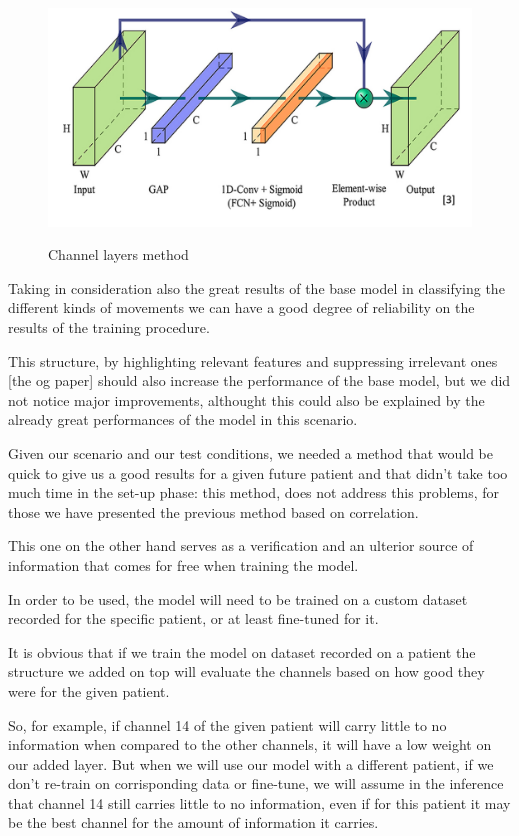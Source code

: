\documentclass{Configuration_Files/PoliMi3i_thesis}
\begin{document}
\begin{figure}[H]
	\includegraphics[scale=0.35]{channelLayer.png}
	\centering
    \label{channel_layers}
    \caption{Channel layers method \cite{tongLearnableEEGChannel2023}}
\end{figure}

Taking in consideration also the great results of the base model in classifying the different kinds of movements we can have a good degree of reliability on the results of the training procedure.

This structure, by highlighting relevant features and suppressing irrelevant ones [the og paper] should also increase the performance of the base model, but we did not notice major improvements, althought this could also be explained by the already great performances of the model in this scenario.

Given our scenario and our test conditions, we needed a method that would be quick to give us a good results for a given future patient and that didn't take too much time in the set-up phase: this method, does not address this problems, for those we have presented the previous method based on correlation.

This one on the other hand serves as a verification and an ulterior source of information that comes for free when training the model.

In order to be used, the model will need to be trained on a custom dataset recorded for the specific patient, or at least fine-tuned for it.

It is obvious that if we train the model on dataset recorded on a patient the structure we added on top will evaluate the channels based on how good they were for the given patient.

So, for example, if channel 14 of the given patient will carry little to no information when compared to the other channels, it will have a low weight on our added layer.
But when we will use our model with a different patient, if we don't re-train on corrisponding data or fine-tune, we will assume in the inference that channel 14 still carries little to no information, even if for this patient it may be the best channel for the amount of information it carries.
\end{document}
